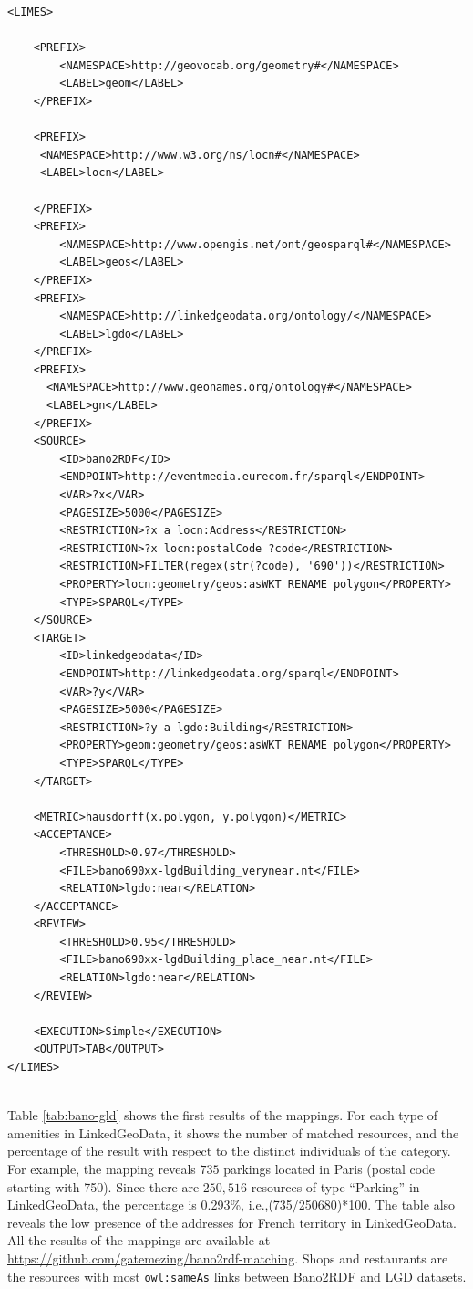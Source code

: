 \begin{lstlisting}
<LIMES>
	
	<PREFIX>
		<NAMESPACE>http://geovocab.org/geometry#</NAMESPACE>
		<LABEL>geom</LABEL>
	</PREFIX>

	<PREFIX>
     <NAMESPACE>http://www.w3.org/ns/locn#</NAMESPACE>
     <LABEL>locn</LABEL>

    </PREFIX>
	<PREFIX>
		<NAMESPACE>http://www.opengis.net/ont/geosparql#</NAMESPACE>
		<LABEL>geos</LABEL>
	</PREFIX>
	<PREFIX>
		<NAMESPACE>http://linkedgeodata.org/ontology/</NAMESPACE>
		<LABEL>lgdo</LABEL>
	</PREFIX>
	<PREFIX>
      <NAMESPACE>http://www.geonames.org/ontology#</NAMESPACE>
      <LABEL>gn</LABEL>
    </PREFIX>
	<SOURCE>
		<ID>bano2RDF</ID>
		<ENDPOINT>http://eventmedia.eurecom.fr/sparql</ENDPOINT>
		<VAR>?x</VAR>
		<PAGESIZE>5000</PAGESIZE>
		<RESTRICTION>?x a locn:Address</RESTRICTION>
		<RESTRICTION>?x locn:postalCode ?code</RESTRICTION>
		<RESTRICTION>FILTER(regex(str(?code), '690'))</RESTRICTION>
		<PROPERTY>locn:geometry/geos:asWKT RENAME polygon</PROPERTY> 
		<TYPE>SPARQL</TYPE>
	</SOURCE>
	<TARGET>
		<ID>linkedgeodata</ID>
		<ENDPOINT>http://linkedgeodata.org/sparql</ENDPOINT>
		<VAR>?y</VAR>
		<PAGESIZE>5000</PAGESIZE>
		<RESTRICTION>?y a lgdo:Building</RESTRICTION>
		<PROPERTY>geom:geometry/geos:asWKT RENAME polygon</PROPERTY>
		<TYPE>SPARQL</TYPE>
	</TARGET>
	
	<METRIC>hausdorff(x.polygon, y.polygon)</METRIC>
	<ACCEPTANCE>
		<THRESHOLD>0.97</THRESHOLD>
		<FILE>bano690xx-lgdBuilding_verynear.nt</FILE>
		<RELATION>lgdo:near</RELATION>
	</ACCEPTANCE>
	<REVIEW>
		<THRESHOLD>0.95</THRESHOLD>
		<FILE>bano690xx-lgdBuilding_place_near.nt</FILE>
		<RELATION>lgdo:near</RELATION>
	</REVIEW>

	<EXECUTION>Simple</EXECUTION>
	<OUTPUT>TAB</OUTPUT>
</LIMES>
	
\end{lstlisting}
  
Table \ref{tab:bano-gld} shows the first results of the mappings. For each type of amenities in LinkedGeoData, it shows the number of matched resources, and the percentage of the result with respect to the distinct individuals of the category. For example, the mapping reveals $735$ parkings located in Paris (postal code starting with 750). Since there are $250,516$ resources of type ``Parking'' in LinkedGeoData, the percentage is 0.293\%, i.e.,(735/250680)*100.  The table also reveals the low presence of the addresses for French territory in LinkedGeoData. All the results of the mappings are available at \url{https://github.com/gatemezing/bano2rdf-matching}. Shops and restaurants are the resources with most \texttt{owl:sameAs} links between Bano2RDF and LGD datasets.

